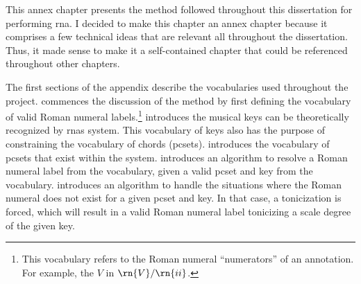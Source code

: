 
This annex chapter presents the method followed throughout
this dissertation for performing \gls{rna}. I decided to
make this chapter an annex chapter because it comprises a
few technical ideas that are relevant all throughout the
dissertation. Thus, it made sense to make it a
self-contained chapter that could be referenced throughout
other chapters.

The first sections of the appendix describe the vocabularies
used throughout the project.
 commences the
discussion of the method by first defining the vocabulary of
valid Roman numeral labels.\footnote{This vocabulary refers
to the Roman numeral ``numerators'' of an annotation. For
example, the $V$ in $\rn{V}/\rn{ii}$.}
 introduces the musical
keys can be theoretically recognized by \glspl{rna} system.
This vocabulary of keys also has the purpose of constraining
the vocabulary of chords (\gls{pcset}s).
 introduces the
vocabulary of \gls{pcset}s that exist within the system.
introduces an algorithm to resolve a Roman numeral label
from the vocabulary, given a valid \gls{pcset} and key from
the vocabulary. 
introduces an algorithm to handle the situations where the
Roman numeral does not exist for a given \gls{pcset} and
key. In that case, a tonicization is forced, which will
result in a valid Roman numeral label tonicizing a scale
degree of the given key.

